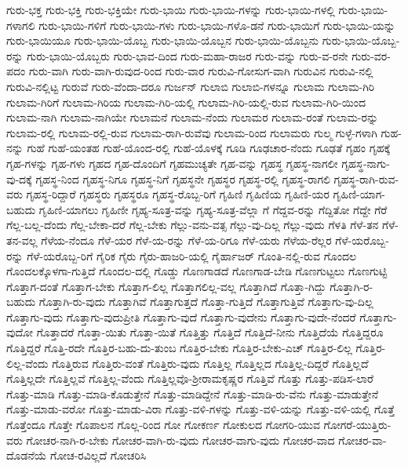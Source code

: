 {ಗುರು-ಭಕ್ತ
ಗುರು-ಭಕ್ತಿ
ಗುರು-ಭಕ್ತಿಯೇ
ಗುರು-ಭಾಯಿ
ಗುರು-ಭಾಯಿ-ಗಳನ್ನು
ಗುರು-ಭಾಯಿ-ಗಳಲ್ಲಿ
ಗುರು-ಭಾಯಿ-ಗಳಾಗಲಿ
ಗುರು-ಭಾಯಿ-ಗಳಿಗೆ
ಗುರು-ಭಾಯಿ-ಗಳು
ಗುರು-ಭಾಯಿ-ಗಳೊ-ಡನೆ
ಗುರು-ಭಾಯಿಗೆ
ಗುರು-ಭಾಯಿ-ಯನ್ನು
ಗುರು-ಭಾಯಿಯೂ
ಗುರು-ಭಾಯಿ-ಯೊಬ್ಬ
ಗುರು-ಭಾಯಿ-ಯೊಬ್ಬನ
ಗುರು-ಭಾಯಿ-ಯೊಬ್ಬನು
ಗುರು-ಭಾಯಿ-ಯೊಬ್ಬ-ರನ್ನು
ಗುರು-ಭಾಯಿ-ಯೊಬ್ಬರು
ಗುರು-ಭಾವ-ದಿಂದ
ಗುರು-ಮಹಾ-ರಾಜರ
ಗುರು-ವನ್ನು
ಗುರು-ವ-ರನೇ
ಗುರು-ವರ-ಪದಂ
ಗುರು-ವಾಗಿ
ಗುರು-ವಾಗಿ-ರುವುದ-ರಿಂದ
ಗುರು-ವಾರ
ಗುರುವಿ-ಗೋಸುಗ-ವಾಗಿ
ಗುರುವಿನ
ಗುರುವಿ-ನಲ್ಲಿ
ಗುರುವಿ-ನಲ್ಲಿಟ್ಟ
ಗುರುವೆ
ಗುರು-ವೆಂದಾ-ದರೂ
ಗುರ್ಜನ್
ಗುಲಾಬಿ
ಗುಲಾಬಿ-ಗಳನ್ನೂ
ಗುಲಾಮ
ಗುಲಾಮ-ಗಿರಿ
ಗುಲಾಮ-ಗಿರಿಗೆ
ಗುಲಾಮ-ಗಿರಿಯ
ಗುಲಾಮ-ಗಿರಿ-ಯಲ್ಲಿ
ಗುಲಾಮ-ಗಿರಿ-ಯಲ್ಲಿ-ರುವ
ಗುಲಾಮ-ಗಿರಿ-ಯಿಂದ
ಗುಲಾಮ-ನಾಗಿ
ಗುಲಾಮ-ನಾಗಿಯೇ
ಗುಲಾಮನೆ
ಗುಲಾಮ-ನೆಂದು
ಗುಲಾಮರ
ಗುಲಾಮ-ರಂತೆ
ಗುಲಾಮ-ರನ್ನು
ಗುಲಾಮ-ರಲ್ಲಿ
ಗುಲಾಮ-ರಲ್ಲಿ-ರುವ
ಗುಲಾಮ-ರಾಗಿ-ರುವೆವು
ಗುಲಾಮ-ರಿಂದ
ಗುಲಾಮರು
ಗುಲ್ಮ
ಗುಳ್ಳೆ-ಗಳಾಗಿ
ಗುಹ-ನನ್ನು
ಗುಹೆ
ಗುಹೆ-ಯಂತಹ
ಗುಹೆ-ಯೊಂದ-ರಲ್ಲಿ
ಗುಹೆ-ಯೊಳಕ್ಕೆ
ಗೂಡಿ
ಗೂಢಚಾರ-ನೆಂದು
ಗೂಢತೆ
ಗೃಹಂ
ಗೃಹಕ್ಕೆ
ಗೃಹ-ಗಳನ್ನು
ಗೃಹ-ಗಳು
ಗೃಹದ
ಗೃಹ-ದೊಂದಿಗೆ
ಗೃಹಮುಚ್ಯತೇ
ಗೃಹ-ವನ್ನು
ಗೃಹಸ್ಥ
ಗೃಹಸ್ಥ-ನಾಗಲೀ
ಗೃಹಸ್ಥ-ನಾಗು-ವು-ದಕ್ಕೆ
ಗೃಹಸ್ಥ-ನಿಂದ
ಗೃಹಸ್ಥ-ನಿಗೂ
ಗೃಹಸ್ಥ-ನಿಗೆ
ಗೃಹಸ್ಥನೇ
ಗೃಹಸ್ಥರ
ಗೃಹಸ್ಥ-ರಲ್ಲಿ
ಗೃಹಸ್ಥ-ರಾಗಲಿ
ಗೃಹಸ್ಥ-ರಾಗಿ-ರುವ-ವರು
ಗೃಹಸ್ಥ-ರಿದ್ದಾರೆ
ಗೃಹಸ್ಥರು
ಗೃಹಸ್ಥರೂ
ಗೃಹಸ್ಥ-ರೊಬ್ಬ-ರಿಗೆ
ಗೃಹಿಣಿ
ಗೃಹಿಣಿಯ
ಗೃಹಿಣಿ-ಯರ
ಗೃಹಿಣಿ-ಯಾಗ-ಬಹುದು
ಗೃಹಿಣಿ-ಯಾಗಲು
ಗೃಹಿಣೀ
ಗೃಹ್ಯ-ಸೂತ್ರ-ವನ್ನು
ಗೃಹ್ಯ-ಸೂತ್ರ-ವೆಲ್ಲಾ
ಗೆ
ಗೆದ್ದವ-ರನ್ನು
ಗೆದ್ದಿತೋ
ಗೆದ್ದೇ
ಗೆರೆ
ಗೆಲ್ಲ-ಬಲ್ಲ-ದೆಂದು
ಗೆಲ್ಲ-ಬೇಕಾ-ದರೆ
ಗೆಲ್ಲ-ಬೇಕು
ಗೆಲ್ಲು-ವನು-ವತ್ಸ
ಗೆಲ್ಲು-ವು-ದಿಲ್ಲ
ಗೆಲ್ಲು-ವುದು
ಗೆಳತಿ
ಗೆಳೆ-ತನ
ಗೆಳೆ-ತನ-ವಲ್ಲ
ಗೆಳೆಯ-ನೆಂದೂ
ಗೆಳೆ-ಯರ
ಗೆಳೆ-ಯ-ರನ್ನು
ಗೆಳೆ-ಯ-ರಿಗೂ
ಗೆಳೆ-ಯರು
ಗೆಳೆಯ-ರೆಲ್ಲರ
ಗೆಳೆ-ಯರೊಬ್ಬ-ರನ್ನು
ಗೆಳೆ-ಯರೊಬ್ಬ-ರಿಗೆ
ಗೈರಿಕ
ಗೈರು
ಗೈರು-ಹಾಜರಿ-ಯಲ್ಲಿ
ಗೈರ್ಹಾಜರ್
ಗೊಂತಿ-ನಲ್ಲಿ-ರುವ
ಗೊಂದಲ
ಗೊಂದಲಕ್ಕೊಳಗಾ-ಗುತ್ತಿದೆ
ಗೊಂದಲ-ದಲ್ಲಿ
ಗೊಡ್ಡು
ಗೊಣಗಾಡದೆ
ಗೊಣಗಾಡ-ಬೇಡಿ
ಗೊಣಗುಟ್ಟಲು
ಗೊಣಗುಟ್ಟಿ
ಗೊತ್ತಾಗ-ದಂತೆ
ಗೊತ್ತಾಗ-ಬೇಕು
ಗೊತ್ತಾಗ-ಲಿಲ್ಲ
ಗೊತ್ತಾಗಲಿಲ್ಲ-ವಲ್ಲ
ಗೊತ್ತಾಗಿದೆ
ಗೊತ್ತಾ-ಗಿದ್ದು
ಗೊತ್ತಾಗಿ-ರ-ಬಹುದು
ಗೊತ್ತಾಗಿ-ರು-ವುದು
ಗೊತ್ತಾಗಿವೆ
ಗೊತ್ತಾಗುತ್ತದೆ
ಗೊತ್ತಾ-ಗುತ್ತಿದೆ
ಗೊತ್ತಾಗುತ್ತಿವೆ
ಗೊತ್ತಾಗು-ವು-ದಿಲ್ಲ
ಗೊತ್ತಾಗು-ವುದು
ಗೊತ್ತಾಗು-ವುದುಪ್ರೀತಿ
ಗೊತ್ತಾಗು-ವುದೆ
ಗೊತ್ತಾಗು-ವುದೇನು
ಗೊತ್ತಾಗು-ವುದೇ-ನೆಂದರೆ
ಗೊತ್ತಾಗು-ವುದೋ
ಗೊತ್ತಾದರೆ
ಗೊತ್ತಾ-ಯಿತು
ಗೊತ್ತಾ-ಯಿತೆ
ಗೊತ್ತಿತ್ತು
ಗೊತ್ತಿದೆ
ಗೊತ್ತಿದೆ-ನೀನು
ಗೊತ್ತಿದೆಯೆ
ಗೊತ್ತಿದ್ದರೂ
ಗೊತ್ತಿದ್ದರೆ
ಗೊತ್ತಿ-ರದೇ
ಗೊತ್ತಿರ-ಬಹು-ದು-ತುಂಬ
ಗೊತ್ತಿರ-ಬೇಕು
ಗೊತ್ತಿರ-ಬೇಕು-ಎಚ್
ಗೊತ್ತಿರ-ಲಿಲ್ಲ
ಗೊತ್ತಿರ-ಲಿಲ್ಲ-ವೆಂದು
ಗೊತ್ತಿರುವ
ಗೊತ್ತಿರು-ವಂತೆ
ಗೊತ್ತಿರು-ವುದು
ಗೊತ್ತಿಲ್ಲ
ಗೊತ್ತಿಲ್ಲದ
ಗೊತ್ತಿಲ್ಲ-ದಿದ್ದರೆ
ಗೊತ್ತಿಲ್ಲದೆ
ಗೊತ್ತಿಲ್ಲದೇ
ಗೊತ್ತಿಲ್ಲವೆ
ಗೊತ್ತಿಲ್ಲ-ವೆಂದು
ಗೊತ್ತಿಲ್ಲವೊ-ಶ್ರೀರಾಮಕೃಷ್ಣರ
ಗೊತ್ತಿವೆ
ಗೊತ್ತು
ಗೊತ್ತು-ಪಡಿಸ-ಲಾರೆ
ಗೊತ್ತು-ಮಾಡಿ
ಗೊತ್ತು-ಮಾಡಿ-ಕೊಡುತ್ತೇನೆ
ಗೊತ್ತು-ಮಾಡಿದ್ದೇನೆ
ಗೊತ್ತು-ಮಾಡಿ-ರು-ವೆನು
ಗೊತ್ತು-ಮಾಡುತ್ತೇನೆ
ಗೊತ್ತು-ಮಾಡು-ವರೋ
ಗೊತ್ತು-ಮಾಡು-ವಿರಾ
ಗೊತ್ತು-ವಳಿ-ಗಳನ್ನು
ಗೊತ್ತು-ವಳಿ-ಯನ್ನು
ಗೊತ್ತು-ವಳಿ-ಯಲ್ಲಿ
ಗೊತ್ತೆ
ಗೊತ್ತೆಂದೂ
ಗೊತ್ತೇ
ಗೊಪಾಲನ
ಗೊಲ್ಲ-ರಿಂದ
ಗೋ
ಗೋಕರ್ಣ
ಗೋಕುಲದ
ಗೋಗರಿ-ಯುವ
ಗೋಗರೆ-ಯುತ್ತಿರು-ವರು
ಗೋಚರ-ನಾಗಿ-ರ-ಬೇಕು
ಗೋಚರ-ವಾಗಿ-ರು-ವುದು
ಗೋಚರ-ವಾಗು-ವುದು
ಗೋಚರ-ವಾದ
ಗೋಚರ-ವಾ-ದೊಡನೆಯೆ
ಗೋಚ-ರವಿಲ್ಲದೆ
ಗೋಚರಿಸಿ
}
